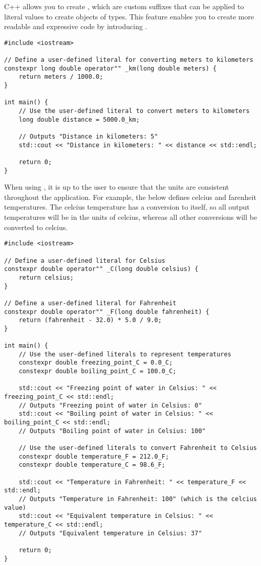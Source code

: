 C++ allows you to create  , which are custom suffixes that can be applied to literal values to create objects of  types. This feature enables you to create more readable and expressive code by introducing  .
\begin{lstlisting}
#include <iostream>

// Define a user-defined literal for converting meters to kilometers
constexpr long double operator"" _km(long double meters) {
    return meters / 1000.0;
}

int main() {
    // Use the user-defined literal to convert meters to kilometers
    long double distance = 5000.0_km;

	// Outputs "Distance in kilometers: 5"
    std::cout << "Distance in kilometers: " << distance << std::endl;

    return 0;
}
\end{lstlisting}

When using  , it is up to the user to ensure that the units are consistent throughout the application. For example, the below defines celcius and farenheit temperatures. The celcius temperature has a conversion to itself, so all output temperatures will be in the units of celcius, whereas all other conversions will be converted to celcius.
\begin{lstlisting}
#include <iostream>

// Define a user-defined literal for Celsius
constexpr double operator"" _C(long double celsius) {
    return celsius;
}

// Define a user-defined literal for Fahrenheit
constexpr double operator"" _F(long double fahrenheit) {
    return (fahrenheit - 32.0) * 5.0 / 9.0;
}

int main() {
    // Use the user-defined literals to represent temperatures
    constexpr double freezing_point_C = 0.0_C;
    constexpr double boiling_point_C = 100.0_C;

    std::cout << "Freezing point of water in Celsius: " << freezing_point_C << std::endl;
	// Outputs "Freezing point of water in Celsius: 0"
    std::cout << "Boiling point of water in Celsius: " << boiling_point_C << std::endl;
	// Outputs "Boiling point of water in Celsius: 100"

    // Use the user-defined literals to convert Fahrenheit to Celsius
    constexpr double temperature_F = 212.0_F;
    constexpr double temperature_C = 98.6_F;

    std::cout << "Temperature in Fahrenheit: " << temperature_F << std::endl;
	// Outputs "Temperature in Fahrenheit: 100" (which is the celcius value)
    std::cout << "Equivalent temperature in Celsius: " << temperature_C << std::endl;
	// Outputs "Equivalent temperature in Celsius: 37"

    return 0;
}
\end{lstlisting}








